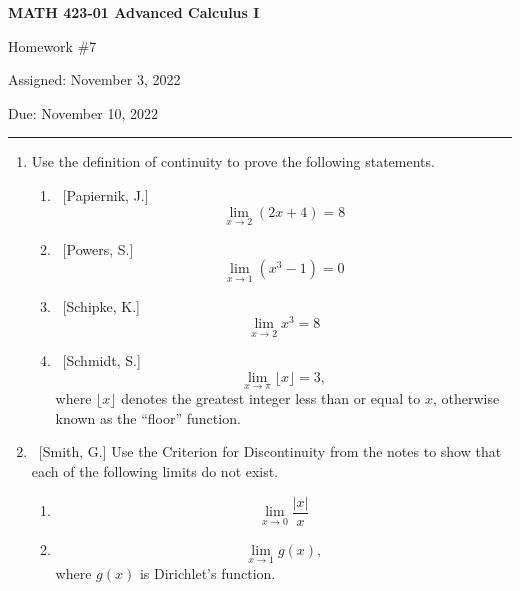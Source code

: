 \documentclass[10pt]{article}
\theoremstyle{definition}
\begin{document}
\pagestyle{empty}  %

\begin{center}  %

{\bf MATH 423-01  Advanced Calculus I

Homework \#7

Assigned: November 3, 2022

Due: November 10, 2022}

\end{center}

\medskip

\hrule   %

\bigskip


\begin{enumerate}


\item  Use the definition of continuity to prove the following statements.

	\begin{enumerate}
	
	\item  ~[Papiernik, J.] $$\lim_{x \to 2} (2x+4) = 8$$
	
	\item  ~[Powers, S.] $$\lim_{x \to 1} (x^3-1) = 0$$
	
	\item  ~[Schipke, K.] $$\lim_{x \to 2} x^3 = 8$$
	
	\item  ~[Schmidt, S.] $$\lim_{x \to \pi} \lfloor x \rfloor = 3,$$ where $\lfloor x \rfloor$ denotes the greatest integer less than or equal to $x$, otherwise known as the ``floor'' function.
	
	\end{enumerate}
	

\item  ~[Smith, G.] Use the Criterion for Discontinuity from the notes to show that each of the following limits do not exist.

	\begin{enumerate}
	
	\item  $$\lim_{x \to 0} \frac{|x|}{x}$$
	
	\item  $$\lim_{x \to 1} g(x),$$ where $g(x)$ is Dirichlet's function.
	

\end{enumerate}
\end{enumerate}
\end{document}
